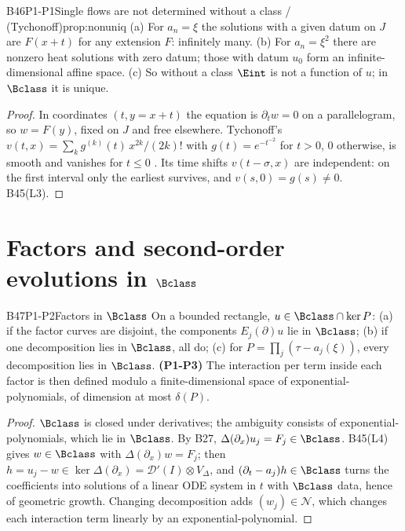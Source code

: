 \begin{dimcard}{B46}{P1-P1}{Single flows are not determined without a class}{\proved{} / \cf{} (Tychonoff)}{prop:nonuniq}
(a) For $a_n=\xi$ the solutions with a given datum on $J$ are $F(x+t)$ for any extension $F$: infinitely many. (b) For $a_n=\xi^2$ there are nonzero heat solutions with zero datum; those with datum $u_0$ form an infinite-dimensional affine space. (c) So without a class $\Eint$ is not a function of $u$; in $\Bclass$ it is unique.
\end{dimcard}
\begin{proof}
In coordinates $(t,y=x+t)$ the equation is $\partial_tw=0$ on a parallelogram, so $w=F(y)$, fixed on $J$ and free elsewhere.
Tychonoff's $v(t,x)=\sum_kg^{(k)}(t)\,x^{2k}/(2k)!$ with $g(t)=e^{-t^{-2}}$ for $t>0$, $0$ otherwise, is smooth and vanishes for $t\le0$ \cf. Its time shifts $v(t-\sigma,x)$ are independent: on the first interval only the earliest survives, and $v(s,0)=g(s)\ne0$.
B45(L3).
\end{proof}

\section{Factors and second-order evolutions in $\Bclass$}

\begin{dimcard}{B47}{P1-P2}{Factors in $\Bclass$}{\proved}{}
\label{dim:P1-P3}%
On a bounded rectangle, $u\in\Bclass\cap\ker P$: (a) if the factor curves are disjoint, the components $E_j(\partial)u$ lie in $\Bclass$; (b) if one decomposition lies in $\Bclass$, all do; (c) for $P=\prod_j(\tau-a_j(\xi))$, every decomposition lies in $\Bclass$. \textbf{(P1-P3)} The interaction per term inside each factor is then defined modulo a finite-dimensional space of exponential-polynomials, of dimension at most $\delta(P)$.
\end{dimcard}
\begin{proof}
$\Bclass$ is closed under derivatives; the ambiguity consists of exponential-polynomials, which lie in $\Bclass$.
By B27, $\Delta(\partial_x)u_j=F_j\in\Bclass$. B45(L4) gives $w\in\Bclass$ with $\Delta(\partial_x)w=F_j$; then $h=u_j-w\in\ker\Delta(\partial_x)=\mathcal D'(I)\otimes V_\Delta$, and $(\partial_t-a_j)h\in\Bclass$ turns the coefficients into solutions of a linear ODE system in $t$ with $\Bclass$ data, hence of geometric growth.
Changing decomposition adds $(w_j)\in\mathcal N$, which changes each interaction term linearly by an exponential-polynomial.
\end{proof}

